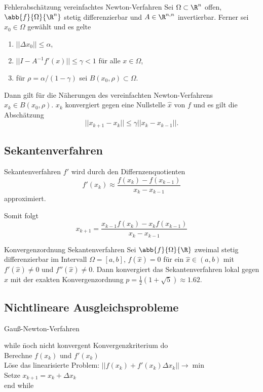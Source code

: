 \begin{karte}{Fehlerabschätzung vereinfachtes Newton-Verfahren}
    Sei \( \Omega \subset \R^n \) offen, \( \abb{f}{\Omega}{\R^n} \) stetig 
    differenzierbar und \(A \in \R^{n,n}\) invertierbar. Ferner sei \(x_0 \in \Omega\) gewählt und es gelte 
    \begin{enumerate}
        \item \(||\Delta x_0 || \leq \alpha\),
        \item \( ||I - A^{-1} f'(x) || \leq \gamma < 1 \) für alle \(x\in \Omega\),
        \item für \(\rho = \alpha/(1-\gamma)\) sei \(B(x_0, \rho) \subset \Omega\).
    \end{enumerate}
    Dann gilt für die Näherungen des vereinfachten Newton-Verfahrens 
    \(x_k \in B(x_0,\rho)\). \(x_k\) konvergiert gegen eine Nullstelle \( \widehat{x} \) von 
    \(f\) und es gilt die Abschätzung 
    \[ ||x_{k+1} - x_k|| \leq \gamma||x_k - x_{k-1}||. \]
\end{karte}

\subsection{Sekantenverfahren}

\begin{karte}{Sekantenverfahren}
    \(f'\) wird durch den Differnzenquotienten 
    \[ f'(x_k) \approx \frac{f(x_k) - f(x_{k-1})}{x_k - x_{k-1}} \]
    approximiert. 

    Somit folgt 
    \[ x_{k+1} = \frac{x_{k-1}f(x_k) - x_kf(x_{k-1})}{x_k - x_{k-1}} \]
\end{karte}

\begin{karte}{Konvergenzordnung Sekantenverfahren}
    Sei \(\abb{f}{\Omega}{\R}\) zweimal stetig differenzierbar im Intervall \(\Omega = [a,b]\), 
    \( f(\widehat{x}) = 0 \) für ein \( \widehat{x} \in (a,b) \) mit \( f'(\widehat{x}) \neq 0 \) 
    und \( f''(\widehat{x}) \neq 0 \). Dann konvergiert das Sekantenverfahren lokal gegen 
    \(\widehat{x}\) mit der exakten Konvergenzordnung \( p = \frac{1}{2}(1+\sqrt{5}) \approx 1.62 \).
\end{karte}

\subsection{Nichtlineare Ausgleichsprobleme}

\begin{karte}{Gauß-Newton-Verfahren}
    \begin{tabbing}
        while \= noch nicht konvergent {Konvergenzkriterium} do \\
        \> Berechne \( f(x_k) \) und \( f'(x_k)\) \\
        \> Löse das linearisierte Problem: \(||f(x_k) + f'(x_k)\Delta x_k|| \rightarrow \min \) \\
        \> Setze \( x_{k+1} = x_k + \Delta x_k \) \\
        end while
    \end{tabbing}
\end{karte}

